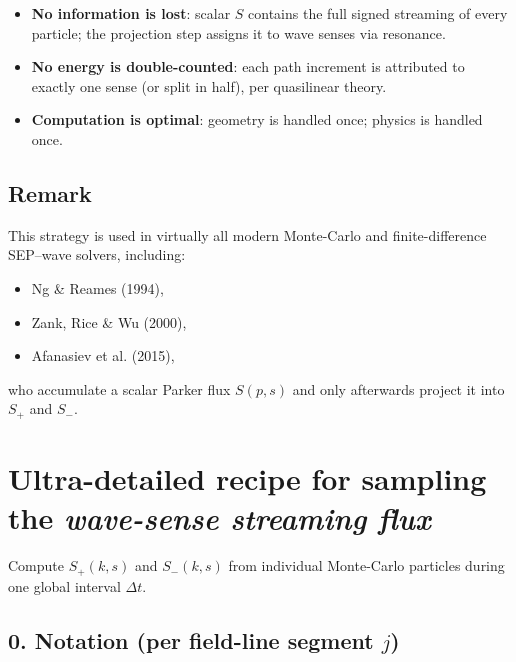 {\begin{itemize}
  \item \textbf{No information is lost}: scalar $S$ contains the full signed streaming of every particle; the projection step assigns it to wave senses via resonance.
  \item \textbf{No energy is double-counted}: each path increment is attributed to exactly one sense (or split in half), per quasilinear theory.
  \item \textbf{Computation is optimal}: geometry is handled once; physics is handled once.
\end{itemize}

\subsection*{Remark}

This strategy is used in virtually all modern Monte-Carlo and finite-difference SEP–wave solvers, including:
\begin{itemize}
  \item Ng \& Reames (1994),
  \item Zank, Rice \& Wu (2000),
  \item Afanasiev et al. (2015),
\end{itemize}
who accumulate a scalar Parker flux $S(p, s)$ and only afterwards project it into $S_{+}$ and $S_{-}$.

\section*{Ultra-detailed recipe for sampling the \emph{wave-sense streaming flux}}

Compute $S_{+}(k, s)$ and $S_{-}(k, s)$ from individual Monte-Carlo particles during one global interval $\Delta t$.

\subsection*{0. Notation (per field-line segment $j$)}

}
